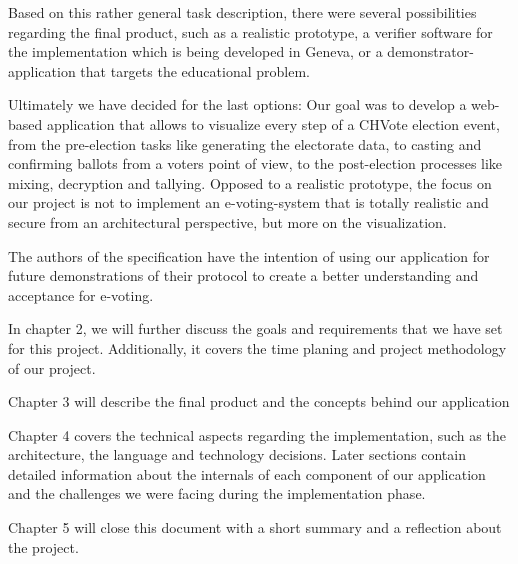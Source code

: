 Based on this rather general task description, there were several possibilities regarding the final product, such as a realistic prototype, a verifier software for the implementation which is being developed in Geneva, or a demonstrator-application that targets the educational problem.

Ultimately we have decided for the last options: Our goal was to develop a web-based application that allows to visualize every step of a CHVote election event, from the pre-election tasks like generating the electorate data, to casting and confirming ballots from a voters point of view, to the post-election processes like mixing, decryption and tallying. Opposed to a realistic prototype, the focus on our project is not to implement an e-voting-system that is totally realistic and secure from an architectural perspective, but more on the visualization.

The authors of the specification have the intention of using our application for future demonstrations of their protocol to create a better understanding and acceptance for e-voting.

In chapter 2, we will further discuss the goals and requirements that we have set for this project. Additionally, it covers the time planing and project methodology of our project.

Chapter 3 will describe the final product and the concepts behind our application

Chapter 4 covers the technical aspects regarding the implementation, such as the architecture, the language and technology decisions. Later sections contain detailed information about the internals of each component of our application and the challenges we were facing during the implementation phase.

Chapter 5 will close this document with a short summary and a reflection about the project.
